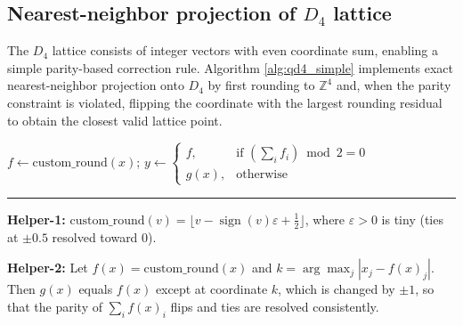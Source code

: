 \documentclass{article}
\theoremstyle{definition}
\theoremstyle{remark}
\begin{document}
\subsection{Nearest-neighbor projection of $D_4$ lattice}
The $D_4$ lattice consists of integer vectors with even coordinate sum, enabling a simple parity-based correction rule. Algorithm \ref{alg:qd4_simple} implements exact nearest-neighbor projection onto $D_4$ by first rounding to $\mathbb{Z}^4$ and, when the parity constraint is violated, flipping the coordinate with the largest rounding residual to obtain the closest valid lattice point.

\begin{algorithm}[h]
\caption{Nearest-neighbor projection $Q_{D_4}(x)$}
\label{alg:qd4_simple}
\scriptsize
\DontPrintSemicolon
{}

\nl $f \leftarrow \mathrm{custom\_round}(x)$;\;
$y \leftarrow \begin{cases}
f, & \text{if } (\sum_i f_i)\bmod 2 = 0\\
g(x), & \text{otherwise}
\end{cases}$\;

\vspace{2pt}
\hrule
\vspace{2pt}

\nl \textbf{Helper-1:} $\mathrm{custom\_round}(v)=\lfloor v-\operatorname{sign}(v)\varepsilon+\tfrac12\rfloor$,
where $\varepsilon>0$ is tiny (ties at $\pm0.5$ resolved toward $0$).\;

\nl \textbf{Helper-2:} Let $f(x)=\mathrm{custom\_round}(x)$ and
$k=\arg\max_j |x_j-f(x)_j|$.
Then $g(x)$ equals $f(x)$ except at coordinate $k$, which is changed by $\pm1$,
so that the parity of $\sum_i f(x)_i$ flips and ties are resolved consistently.\;
\end{algorithm}
\end{document}
